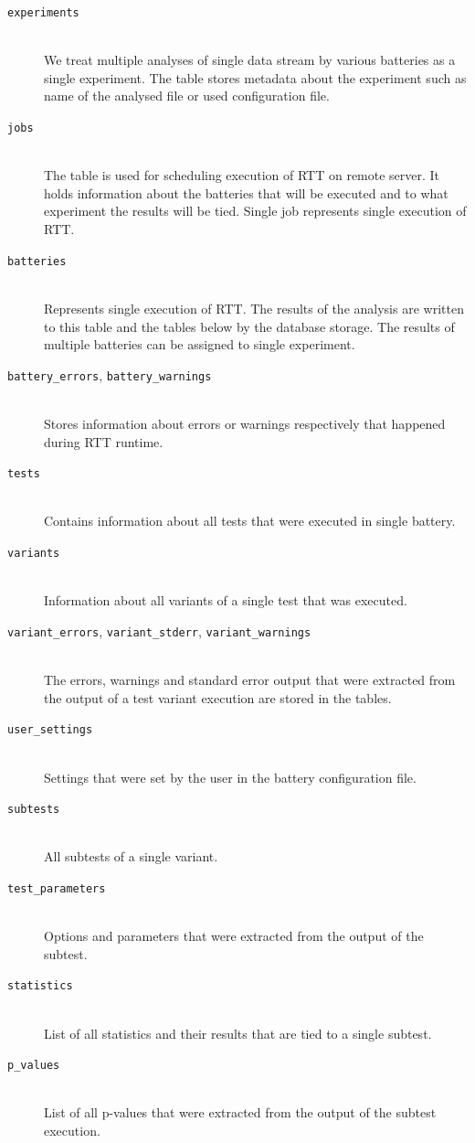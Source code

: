 \documentclass[
  digital,  	%
  color,		%
  oneside,   	%
  12pt,
  nocover,
  notable,
  nolof,
  nolot,
]{fithesis3}
\begin{document}
\begin{description}
\item[\texttt{experiments}] \hfill \\
We treat multiple analyses of single data stream by various batteries as a single experiment. The table stores metadata about the experiment such as name of the analysed file or used configuration file.
\item[\texttt{jobs}] \hfill \\
The table is used for scheduling execution of RTT on remote server. It holds information about the batteries that will be executed and to what experiment the results will be tied. Single job represents single execution of RTT.
\item[\texttt{batteries}] \hfill \\
Represents single execution of RTT. The results of the analysis are written to this table and the tables below by the database storage. The results of multiple batteries can be assigned to single experiment.
\item[\texttt{battery\_errors}, \texttt{battery\_warnings}] \hfill \\
Stores information about errors or warnings respectively that happened during RTT runtime.
\item[\texttt{tests}] \hfill \\
Contains information about all tests that were executed in single battery.
\item[\texttt{variants}] \hfill \\
Information about all variants of a single test that was executed.
\item[\texttt{variant\_errors}, \texttt{variant\_stderr}, \texttt{variant\_warnings}] \hfill \\
The errors, warnings and standard error output that were extracted from the output of a test variant execution are stored in the tables.
\item[\texttt{user\_settings}] \hfill \\
Settings that were set by the user in the battery configuration file.
\item[\texttt{subtests}] \hfill \\
All subtests of a single variant.
\item[\texttt{test\_parameters}] \hfill \\
Options and parameters that were extracted from the output of the subtest.
\item[\texttt{statistics}] \hfill \\
List of all statistics and their results that are tied to a single subtest.
\item[\texttt{p\_values}] \hfill \\
List of all p-values that were extracted from the output of the subtest execution.
\end{description}
\end{document}
